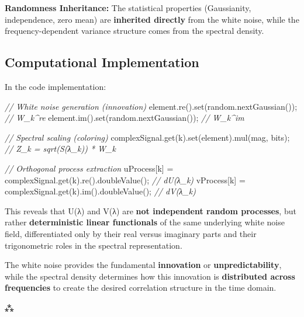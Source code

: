 \documentclass[
]{article}
\newenvironment{Shaded}{}{}
\newcommand{\CommentTok}[1]{\textcolor[rgb]{0.38,0.63,0.69}{\textit{#1}}}
\newcommand{\FunctionTok}[1]{\textcolor[rgb]{0.02,0.16,0.49}{#1}}
\newcommand{\NormalTok}[1]{#1}
\newcommand{\OperatorTok}[1]{\textcolor[rgb]{0.40,0.40,0.40}{#1}}
\begin{document}
\textbf{Randomness Inheritance:} The statistical properties
(Gaussianity, independence, zero mean) are \textbf{inherited directly}
from the white noise, while the frequency-dependent variance structure
comes from the spectral density.

\subsection{Computational
Implementation}\label{computational-implementation}

In the code implementation:

\begin{Shaded}
\begin{Highlighting}[]
\CommentTok{// White noise generation (innovation)}
\NormalTok{element}\OperatorTok{.}\FunctionTok{re}\OperatorTok{().}\FunctionTok{set}\OperatorTok{(}\NormalTok{random}\OperatorTok{.}\FunctionTok{nextGaussian}\OperatorTok{());}  \CommentTok{// W\_k\^{}re}
\NormalTok{element}\OperatorTok{.}\FunctionTok{im}\OperatorTok{().}\FunctionTok{set}\OperatorTok{(}\NormalTok{random}\OperatorTok{.}\FunctionTok{nextGaussian}\OperatorTok{());}  \CommentTok{// W\_k\^{}im}

\CommentTok{// Spectral scaling (coloring)}
\NormalTok{complexSignal}\OperatorTok{.}\FunctionTok{get}\OperatorTok{(}\NormalTok{k}\OperatorTok{).}\FunctionTok{set}\OperatorTok{(}\NormalTok{element}\OperatorTok{).}\FunctionTok{mul}\OperatorTok{(}\NormalTok{mag}\OperatorTok{,}\NormalTok{ bits}\OperatorTok{);}  \CommentTok{// Z\_k = sqrt(S(λ\_k)) * W\_k}

\CommentTok{// Orthogonal process extraction}
\NormalTok{uProcess}\OperatorTok{[}\NormalTok{k}\OperatorTok{]} \OperatorTok{=}\NormalTok{ complexSignal}\OperatorTok{.}\FunctionTok{get}\OperatorTok{(}\NormalTok{k}\OperatorTok{).}\FunctionTok{re}\OperatorTok{().}\FunctionTok{doubleValue}\OperatorTok{();}  \CommentTok{// dU(λ\_k)}
\NormalTok{vProcess}\OperatorTok{[}\NormalTok{k}\OperatorTok{]} \OperatorTok{=}\NormalTok{ complexSignal}\OperatorTok{.}\FunctionTok{get}\OperatorTok{(}\NormalTok{k}\OperatorTok{).}\FunctionTok{im}\OperatorTok{().}\FunctionTok{doubleValue}\OperatorTok{();}  \CommentTok{// dV(λ\_k)}
\end{Highlighting}
\end{Shaded}

This reveals that U(λ) and V(λ) are \textbf{not independent random
processes}, but rather \textbf{deterministic linear functionals} of the
same underlying white noise field, differentiated only by their real
versus imaginary parts and their trigonometric roles in the spectral
representation.

The white noise provides the fundamental \textbf{innovation} or
\textbf{unpredictability}, while the spectral density determines how
this innovation is \textbf{distributed across frequencies} to create the
desired correlation structure in the time domain.

⁂
\end{document}
